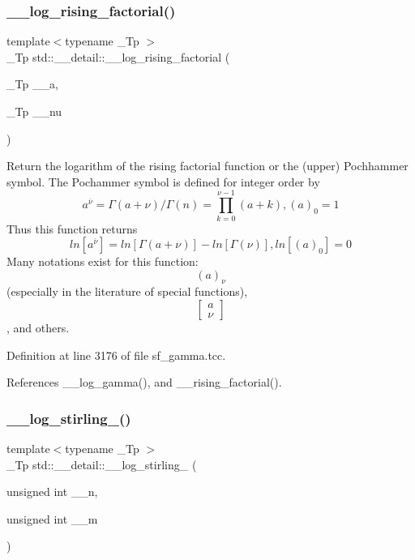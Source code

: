 \subsubsection{\texorpdfstring{\+\_\+\+\_\+log\+\_\+rising\+\_\+factorial()}{\_\_log\_rising\_factorial()}}
{\footnotesize\ttfamily template$<$typename \+\_\+\+Tp $>$ \\
\+\_\+\+Tp std\+::\+\_\+\+\_\+detail\+::\+\_\+\+\_\+log\+\_\+rising\+\_\+factorial (\begin{DoxyParamCaption}\item[{\+\_\+\+Tp}]{\+\_\+\+\_\+a,  }\item[{\+\_\+\+Tp}]{\+\_\+\+\_\+nu }\end{DoxyParamCaption})}



Return the logarithm of the rising factorial function or the (upper) Pochhammer symbol. The Pochammer symbol is defined for integer order by \[ a^{\overline{\nu}} = \Gamma(a + \nu) / \Gamma(n) = \prod_{k=0}^{\nu-1} (a + k), (a)_0 = 1 \] Thus this function returns \[ ln[a^{\overline{\nu}}] = ln[\Gamma(a + \nu)] - ln[\Gamma(\nu)], ln[(a)_0] = 0 \] Many notations exist for this function\+: \[ (a)_\nu \] (especially in the literature of special functions), \[ \left[ \begin{array}{c} a \\ \nu \end{array} \right] \], and others. 



Definition at line 3176 of file sf\+\_\+gamma.\+tcc.



References \+\_\+\+\_\+log\+\_\+gamma(), and \+\_\+\+\_\+rising\+\_\+factorial().

\mbox{\label{namespacestd_1_1____detail_a4924c5c0666c33328d6276b5dbbdfad5}} 
\subsubsection{\texorpdfstring{\+\_\+\+\_\+log\+\_\+stirling\+\_()}{\_\_log\_stirling\_1()}}
{\footnotesize\ttfamily template$<$typename \+\_\+\+Tp $>$ \\
\+\_\+\+Tp std\+::\+\_\+\+\_\+detail\+::\+\_\+\+\_\+log\+\_\+stirling\+\_ (\begin{DoxyParamCaption}\item[{unsigned int}]{\+\_\+\+\_\+n,  }\item[{unsigned int}]{\+\_\+\+\_\+m }\end{DoxyParamCaption})}

